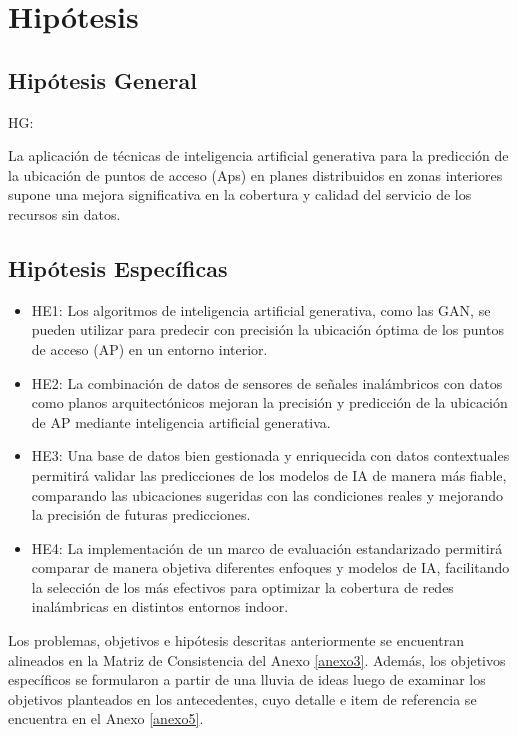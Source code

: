 \section{Hipótesis}

\subsection{Hipótesis General}
HG: \newcommand{\HipotesisGeneral}{
	La aplicación de técnicas de inteligencia artificial generativa para la predicción de la ubicación de puntos de acceso (Aps) en planes distribuidos en zonas interiores supone una mejora significativa en la cobertura y calidad del servicio de los recursos sin datos.
}
\HipotesisGeneral
\subsection{Hipótesis Específicas}
\newcommand{\Hone}{
	Los algoritmos de inteligencia artificial generativa, como las GAN, se pueden utilizar para predecir con precisión la ubicación óptima de los puntos de acceso (AP) en un entorno interior. 
}
\newcommand{\Htwo}{
	La combinación de datos de sensores de señales inalámbricos con datos como planos arquitectónicos mejoran la precisión y predicción de la ubicación de AP mediante inteligencia artificial generativa.
}
\newcommand{\Hthree}{
	Una base de datos bien gestionada y enriquecida con datos contextuales permitirá validar las predicciones de los modelos de IA de manera más fiable, comparando las ubicaciones sugeridas con las condiciones reales y mejorando la precisión de futuras predicciones.
}
\newcommand{\Hfour}{
	La implementación de un marco de evaluación estandarizado permitirá comparar de manera objetiva diferentes enfoques y modelos de IA, facilitando la selección de los más efectivos para optimizar la cobertura de redes inalámbricas en distintos entornos indoor.
}

\begin{itemize}
	\item HE1: \Hone
	\item HE2: \Htwo
	\item HE3: \Hthree
	\item HE4: \Hfour
\end{itemize}

Los problemas, objetivos e hipótesis descritas anteriormente se encuentran alineados en la Matriz de Consistencia del Anexo \ref{anexo3}. Además, los objetivos específicos se formularon a partir de una lluvia de ideas luego de examinar los objetivos planteados en los antecedentes, cuyo detalle e item de referencia se encuentra en el Anexo \ref{anexo5}.

